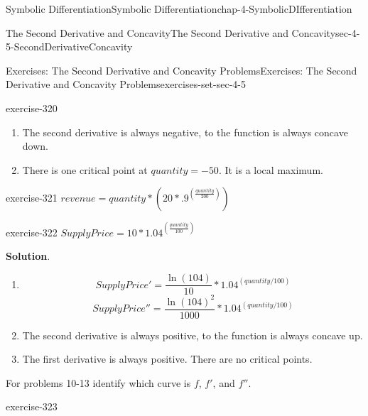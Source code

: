 \documentclass[oneside,10pt,]{book}
\numberwithin{equation}{section}
\begin{document}
\begin{chapterptx}{Symbolic Differentiation}{}{Symbolic Differentiation}{}{}{chap-4-SymbolicDIfferentiation}
\begin{sectionptx}{The Second Derivative and Concavity}{}{The Second Derivative and Concavity}{}{}{sec-4-5-SecondDerivativeConcavity}
\begin{exercises-subsection-numberless}{Exercises: The Second Derivative and Concavity Problems}{}{Exercises: The Second Derivative and Concavity Problems}{}{}{exercises-set-sec-4-5}
\begin{exercisegroup}
\begin{divisionexerciseeg}{7}{}{}{exercise-320}
\begin{enumerate}[label=(\alph*)]
%
\begin{equation*}
price''=\frac{-1}{5000}
\end{equation*}
%
\item\hypertarget{li-553}{}\hypertarget{p-1837}{}%
The second derivative is always negative, to the function is always concave down.%
\item\hypertarget{li-554}{}\hypertarget{p-1838}{}%
There is one critical point at \(quantity=-50\).  It is a local maximum.%
\end{enumerate}
\end{divisionexerciseeg}%
\begin{divisionexerciseeg}{8}{}{}{exercise-321}%
\hypertarget{p-1839}{}%
\(revenue=quantity*\left(20*.9^
{\left(\frac{quantity}{200}\right)}\right)\)%
\end{divisionexerciseeg}%
\begin{divisionexerciseeg}{9}{}{}{exercise-322}%
\hypertarget{p-1840}{}%
\(SupplyPrice= 10*1.04^{\left(\frac{quantity}{100}\right)}\)%
\par\smallskip%
\noindent\textbf{Solution}.\hypertarget{solution-161}{}\quad%
\leavevmode%
\begin{enumerate}[label=(\alph*)]
\item\hypertarget{li-555}{}%
\begin{equation*}
SupplyPrice'=\frac{\ln(104)}{10}*1.04^{(quantity/100)} 
\end{equation*}
%
\begin{equation*}
SupplyPrice''=\frac{\ln(104)^2}{1000}*1.04^{(quantity/100)}
\end{equation*}
%
\item\hypertarget{li-556}{}\hypertarget{p-1841}{}%
The second derivative is always positive, to the function is always concave up.%
\item\hypertarget{li-557}{}\hypertarget{p-1842}{}%
The first derivative is always positive.  There are no critical points.%
\end{enumerate}
\end{divisionexerciseeg}%
\end{exercisegroup}
\par\medskip\noindent
\par\medskip\noindent%
\hypertarget{exercisegroup-22}{}%
\hypertarget{p-1843}{}%
For problems 10-13 identify which curve is \(f\), \(f'\), and \(f''\).%
\begin{exercisegroup}
\begin{divisionexerciseeg}{10}{}{}{exercise-323}%
\hypertarget{p-1844}{}%

\end{divisionexerciseeg}
\end{exercisegroup}
\end{exercises-subsection-numberless}
\end{sectionptx}
\end{chapterptx}
\end{document}
